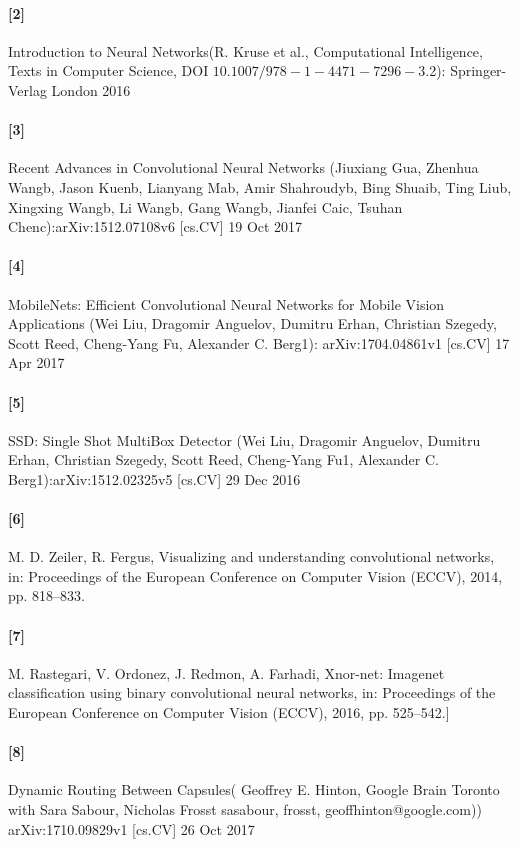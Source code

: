\documentclass[12pt]{article}
\begin{document}
\paragraph*{[2]}
Introduction to Neural Networks(R. Kruse et al., Computational Intelligence, Texts in Computer Science, DOI $10.1007/978-1-4471-7296-$3.2): Springer-Verlag London 2016
\paragraph*{[3]}
Recent Advances in Convolutional Neural Networks (Jiuxiang Gua, Zhenhua Wangb, Jason Kuenb, Lianyang Mab, Amir Shahroudyb, Bing Shuaib, Ting
Liub, Xingxing Wangb, Li Wangb, Gang Wangb, Jianfei Caic, Tsuhan Chenc):arXiv:1512.07108v6 [cs.CV] 19 Oct 2017
\paragraph*{[4]}
MobileNets: Efficient Convolutional Neural Networks for Mobile Vision Applications (Wei Liu, Dragomir Anguelov, Dumitru Erhan, Christian Szegedy, Scott Reed, Cheng-Yang Fu, Alexander C. Berg1): arXiv:1704.04861v1 [cs.CV] 17 Apr 2017
\paragraph*{[5]}
SSD: Single Shot MultiBox Detector (Wei Liu, Dragomir Anguelov, Dumitru Erhan, Christian Szegedy, Scott Reed, Cheng-Yang Fu1, Alexander C. Berg1):arXiv:1512.02325v5 [cs.CV] 29 Dec 2016
\paragraph*{[6]}
M. D. Zeiler, R. Fergus, Visualizing and understanding convolutional networks, in: Proceedings of the European Conference on Computer Vision (ECCV), 2014, pp. 818–833.
\paragraph*{[7]}
M. Rastegari, V. Ordonez, J. Redmon, A. Farhadi, Xnor-net: Imagenet classification using binary convolutional neural networks, in: Proceedings of the European Conference on Computer Vision (ECCV), 2016, pp. 525–542.]
\paragraph*{[8]}
Dynamic Routing Between Capsules( Geoffrey E. Hinton, Google Brain Toronto with Sara Sabour, Nicholas Frosst {sasabour, frosst, geoffhinton}@google.com)) arXiv:1710.09829v1 [cs.CV] 26 Oct 2017
\end{document}
